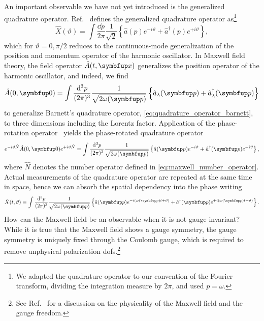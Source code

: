 An important observable we have not yet introduced is the generalized quadrature operator.
Ref.~\cite[p.~79]{Barnett2002} defines the generalized quadrature operator as\footnote{We adapted the quadrature operator to our convention of the Fourier transform, dividing the integration measure by $2\pi$, and used $p=\omega$.}
\begin{equation}
	\hat{X}(\vartheta)
	=
	\int\frac{\dd{p}}{2\pi}
	\frac{1}{\sqrt{2}}
	\left\{
		\hat{a}(p)
		e^{-i\vartheta}
		+
		\hat{a}^\dagger(p)
		e^{+i\vartheta}
	\right\}
	,
	\label{eq:quadrature_operator_barnett}
\end{equation}
which for $\vartheta=0,\pi/2$ reduces to the continuous-mode generalization of the position and momentum operator of the harmonic oscillator.
In Maxwell field theory, the field operator $\hat{A}(t,\vb{x})$ generalizes the position operator of the harmonic oscillator, and indeed, we find
\begin{equation}
	\hat{A}(0,\vb{0})
	=
	\int\frac{\dd[3]{p}}{(2\pi)^3}
	\frac{1}{\sqrt{2\omega(\vb{p})}}
	\left\{
		\hat{a}_\lambda(\vb{p})
		+
		\hat{a}_\lambda^\dagger(\vb{p})
	\right\}
\end{equation}
to generalize Barnett's quadrature operator, \cref{eq:quadrature_operator_barnett}, to three dimensions including the Lorentz factor.
Application of the phase-rotation operator~\cite[p.~38]{Leonhardt2010} yields the phase-rotated quadrature operator
\begin{equation}
	e^{-i\vartheta\hat{N}}
	\hat{A}(0,\vb{0})
	e^{+i\vartheta\hat{N}}
	=
	\int\frac{\dd[3]{p}}{(2\pi)^3}
	\frac{1}{\sqrt{2\omega(\vb{p})}}
	\left\{
		\hat{a}(\vb{p})
		e^{-i\vartheta}
		+
		\hat{a}^\dagger(\vb{p})
		e^{+i\vartheta}
	\right\}
	,
\end{equation}
where $\hat{N}$ denotes the number operator defined in \cref{eq:maxwell_number_operator}.
Actual measurements of the quadrature operator are repeated at the same time in space, hence we can absorb the spatial dependency into the phase writing
\begin{equation}
	\hat{X}(t,\vartheta)
	=
	\int\frac{\dd[3]{p}}{(2\pi)^3}
	\frac{1}{\sqrt{2\omega(\vb{p})}}
	\left\{
		\hat{a}(\vb{p})
		e^{-i(\omega(\vb{p})t+\vartheta)}
		+
		\hat{a}^\dagger(\vb{p})
		e^{+i(\omega(\vb{p})t+\vartheta)}
	\right\}
	.
	\label{eq:quadrature_operator}
\end{equation}
How can the Maxwell field be an observable when it is not gauge invariant?
While it is true that the Maxwell field shows a gauge symmetry, the gauge symmetry is uniquely fixed through the Coulomb gauge, which is required to remove unphysical polarization \glspl{dof}.\footnote{See Ref.~\cite{stackexchange676622} for a discussion on the physicality of the Maxwell field and the gauge freedom.}
